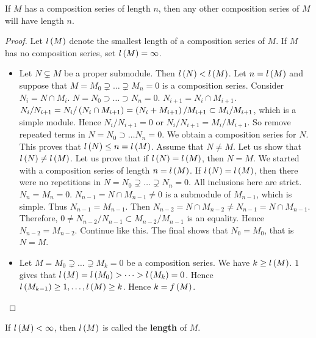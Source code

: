 \begin{proposition}
If $ M $ has a composition series of length $ n $, then any other composition series of $ M $ will have length $ n $.
\end{proposition}

\begin{proof}
Let $ l\br{M} $ denote the smallest length of a composition series of $ M $. If $ M $ has no composition series, set $ l\br{M} = \infty $.
\begin{itemize}
\item Let $ N \subsetneq M $ be a proper submodule. Then $ l\br{N} < l\br{M} $. Let $ n = l\br{M} $ and suppose that $ M = M_0 \supsetneq \dots \supsetneq M_n = 0 $ is a composition series. Consider $ N_i = N \cap M_i $. $ N = N_0 \supset \dots \supset N_n = 0 $. $ N_{i + 1} = N_i \cap M_{i + 1} $. $ N_i / N_{i + 1} = N_i / \br{N_i \cap M_{i + 1}} = \br{N_i + M_{i + 1}} / M_{i + 1} \subset M_i / M_{i + 1} $, which is a simple module. Hence $ N_i / N_{i + 1} = 0 $ or $ N_i / N_{i + 1} = M_i / M_{i + 1} $. So remove repeated terms in $ N = N_0 \supset \dots N_n = 0 $. We obtain a composition series for $ N $. This proves that $ l\br{N} \le n = l\br{M} $. Assume that $ N \ne M $. Let us show that $ l\br{N} \ne l\br{M} $. Let us prove that if $ l\br{N} = l\br{M} $, then $ N = M $. We started with a composition series of length $ n = l\br{M} $. If $ l\br{N} = l\br{M} $, then there were no repetitions in $ N = N_0 \supsetneq \dots \supsetneq N_n = 0 $. All inclusions here are strict. $ N_n = M_n = 0 $. $ N_{n - 1} = N \cap M_{n - 1} \ne 0 $ is a submodule of $ M_{n - 1} $, which is simple. Thus $ N_{n - 1} = M_{n - 1} $. Then $ N_{n - 2} = N \cap M_{n - 2} \ne N_{n - 1} = N \cap M_{n - 1} $. Therefore, $ 0 \ne N_{n - 2} / N_{n - 1} \subset M_{n - 2} / M_{n - 1} $ is an equality. Hence $ N_{n - 2} = M_{n - 2} $. Continue like this. The final shows that $ N_0 = M_0 $, that is $ N = M $.
\item Let $ M = M_0 \supsetneq \dots \supsetneq M_k = 0 $ be a composition series. We have $ k \ge l\br{M} $. $ 1 $ gives that $ l\br{M} = l\br{M_0} > \dots > l\br{M_k} = 0 $. Hence $ l\br{M_{k - 1}} \ge 1, \dots, l\br{M} \ge k $. Hence $ k = f\br{M} $.
\end{itemize}
\end{proof}

\begin{definition}
If $ l\br{M} < \infty $, then $ l\br{M} $ is called the \textbf{length} of $ M $.
\end{definition}

